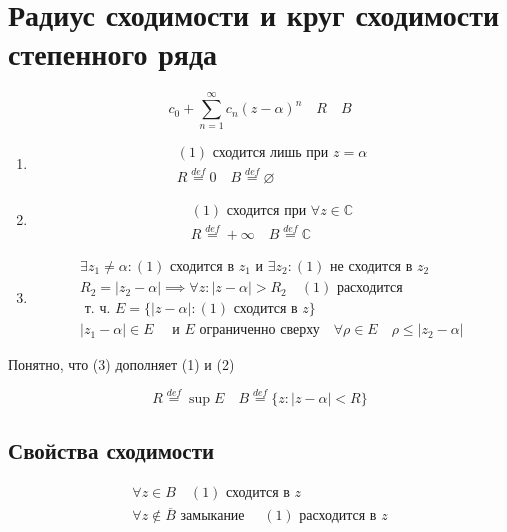 \documentclass[main]{subfiles}
\begin{document}
\section{Радиус сходимости и круг сходимости степенного ряда}
   \[ c_0 + \sum^\infty_{n=1} c_n(z-\alpha)^n  \quad R \quad B\tag{1} \]
\begin{enumerate}
    \item \begin{gather*}
        (1) \text{ сходится лишь при } z = \alpha \\
        R \stackrel{def}{=} 0 \quad B \stackrel{def}{=} \varnothing
    \end{gather*}
    \item \begin{gather*}
        (1) \text{ сходится при } \forall z \in \mathbb{C} \\
        R \stackrel{def}{=} +\infty \quad B \stackrel{def}{=} \mathbb{C}
    \end{gather*}
    \item \begin{gather*}
        \exists z_1 \ne \alpha : (1) \text{ сходится  в } z_1 \text{ и } \exists z_2 : (1) \text{ не сходится в } z_2 \\
        R_2 = |z_2 - \alpha| \implies \forall z : |z-\alpha| > R_2 \quad (1) \text{ расходится } \\
        \text{ т. ч. } E = \{ |z-\alpha|: (1) \text{ сходится в } z \} \\
        |z_1 - \alpha| \in E \quad \text{ и } E \text{ ограниченно сверху} \quad \forall \rho \in E \quad \rho \leq |z_2 - \alpha|
    \end {gather*}
\end{enumerate}
Понятно, что (3) дополняет (1) и (2)
\begin{definition}
    \[ R \stackrel{def}{=} \sup E \quad B \stackrel{def}{=} \{ z: |z-\alpha| < R \} \]
\end{definition}
\subsection*{Свойства сходимости} 
\begin{theorem}
    \begin{gather*}
        \forall z \in B \quad (1) \text{ сходится в } z \tag{2} \\
        \forall z \notin \overline{B} \text{ замыкание } \quad (1) \text{ расходится в } z \tag{3} 
    \end{gather*}
\end{theorem}
\end{document}
